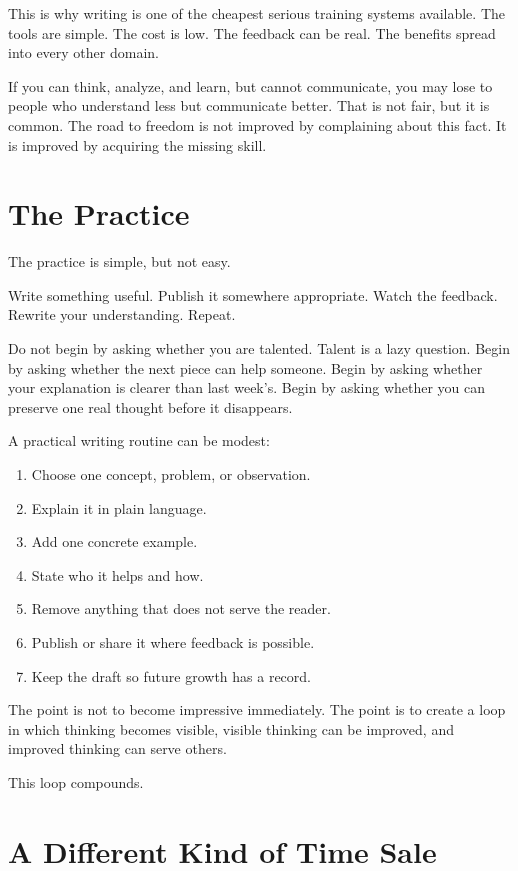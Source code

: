 This is why writing is one of the cheapest serious training systems available. The tools are simple. The cost is low. The feedback can be real. The benefits spread into every other domain.

If you can think, analyze, and learn, but cannot communicate, you may lose to people who understand less but communicate better. That is not fair, but it is common. The road to freedom is not improved by complaining about this fact. It is improved by acquiring the missing skill.

\section*{The Practice}

The practice is simple, but not easy.

Write something useful. Publish it somewhere appropriate. Watch the feedback. Rewrite your understanding. Repeat.

Do not begin by asking whether you are talented. Talent is a lazy question. Begin by asking whether the next piece can help someone. Begin by asking whether your explanation is clearer than last week's. Begin by asking whether you can preserve one real thought before it disappears.

A practical writing routine can be modest:

\begin{enumerate}
\item Choose one concept, problem, or observation.
\item Explain it in plain language.
\item Add one concrete example.
\item State who it helps and how.
\item Remove anything that does not serve the reader.
\item Publish or share it where feedback is possible.
\item Keep the draft so future growth has a record.
\end{enumerate}

The point is not to become impressive immediately. The point is to create a loop in which thinking becomes visible, visible thinking can be improved, and improved thinking can serve others.

This loop compounds.

\section*{A Different Kind of Time Sale}

